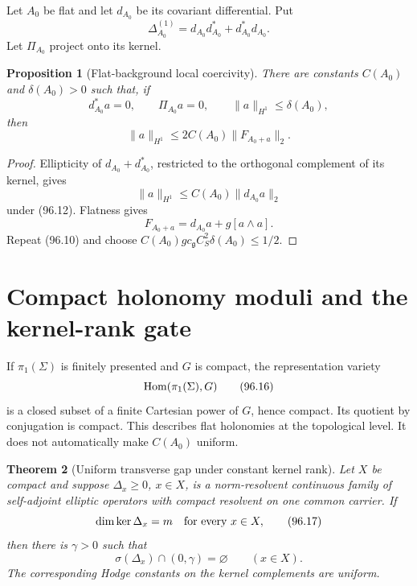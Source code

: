 \documentclass[11pt]{article}
\newtheorem{theorem}{Theorem}[section]
\newtheorem{proposition}[theorem]{Proposition}
\theoremstyle{remark}
\begin{document}
Let \(A_0\) be flat and let \(d_{A_0}\) be its covariant
differential.  Put
\[
 \Delta_{A_0}^{(1)}
 =d_{A_0}d_{A_0}^*+d_{A_0}^*d_{A_0}.                 \tag{96.11}
\]
Let \(\Pi_{A_0}\) project onto its kernel.

\begin{proposition}[Flat-background local coercivity]
\label{prop:v15v96-flat-local}
There are constants \(C(A_0)\) and \(\delta(A_0)>0\) such that, if
\[
 d_{A_0}^*a=0,\qquad \Pi_{A_0}a=0,\qquad
 \|a\|_{H^1}\leq\delta(A_0),                           \tag{96.12}
\]
then
\[
 \|a\|_{H^1}
 \leq2C(A_0)\|F_{A_0+a}\|_2.                          \tag{96.13}
\]
\end{proposition}

\begin{proof}
Ellipticity of \(d_{A_0}+d_{A_0}^*\), restricted to the orthogonal
complement of its kernel, gives
\[
 \|a\|_{H^1}\leq C(A_0)\|d_{A_0}a\|_2                \tag{96.14}
\]
under (96.12).  Flatness gives
\[
 F_{A_0+a}=d_{A_0}a+g[a\wedge a].                    \tag{96.15}
\]
Repeat (96.10) and choose
\(C(A_0)g c_{\mathfrak g}C_S^2\delta(A_0)\leq1/2\).
\end{proof}

\section{Compact holonomy moduli and the kernel-rank gate}

If \(\pi_1(\Sigma)\) is finitely presented and \(G\) is compact,
the representation variety
\[
 {\rm Hom}(\pi_1(\Sigma),G)                           \tag{96.16}
\]
is a closed subset of a finite Cartesian power of \(G\), hence
compact.  Its quotient by conjugation is compact.  This describes
flat holonomies at the topological level.  It does not automatically
make \(C(A_0)\) uniform.

\begin{theorem}[Uniform transverse gap under constant kernel rank]
\label{thm:v15v96-uniform-gap}
Let \(X\) be compact and suppose
\(\Delta_x\geq0\), \(x\in X\), is a norm-resolvent continuous
family of self-adjoint elliptic operators with compact resolvent on
one common carrier.  If
\[
 \dim\ker\Delta_x=m\quad\hbox{for every }x\in X,       \tag{96.17}
\]
then there is \(\gamma>0\) such that
\[
 \sigma(\Delta_x)\cap(0,\gamma)=\varnothing
 \qquad(x\in X).                                      \tag{96.18}
\]
The corresponding Hodge constants on the kernel complements are
uniform.
\end{theorem}
\end{document}
